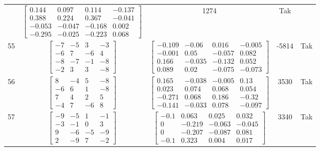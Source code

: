 \documentclass[a4paper,12pt]{article}
\begin{document}
\begin{tabular}{c c c c c}
&
$\begin{bmatrix} 0.144 & 0.097 & 0.114 & -0.137 \\ 0.388 & 0.224 & 0.367 & -0.041 \\ -0.053 & -0.047 & -0.168 & 0.002 \\ -0.295 & -0.025 & -0.223 & 0.068 \end{bmatrix}$
&
1274
&
Tak
\\
55
&
$\begin{bmatrix} -7 & -5 & 3 & -3 \\ -6 & 7 & -6 & 4 \\ -8 & -7 & -1 & -8 \\ -2 & 3 & 3 & -8 \end{bmatrix}$
&
$\begin{bmatrix} -0.109 & -0.06 & 0.016 & -0.005 \\ -0.001 & 0.05 & -0.057 & 0.082 \\ 0.166 & -0.035 & -0.132 & 0.052 \\ 0.089 & 0.02 & -0.075 & -0.073 \end{bmatrix}$
&
-5814
&
Tak
\\
56
&
$\begin{bmatrix} 8 & -4 & 5 & -8 \\ -6 & 6 & 1 & -8 \\ 7 & 4 & 2 & 5 \\ -4 & 7 & -6 & 8 \end{bmatrix}$
&
$\begin{bmatrix} 0.165 & -0.038 & -0.005 & 0.13 \\ 0.023 & 0.074 & 0.068 & 0.054 \\ -0.271 & 0.068 & 0.186 & -0.32 \\ -0.141 & -0.033 & 0.078 & -0.097 \end{bmatrix}$
&
3530
&
Tak
\\
57
&
$\begin{bmatrix} -9 & -5 & 1 & -1 \\ -3 & -1 & 0 & 3 \\ 9 & -6 & -5 & -9 \\ 2 & -9 & 7 & -2 \end{bmatrix}$
&
$\begin{bmatrix} -0.1 & 0.063 & 0.025 & 0.032 \\ 0 & -0.219 & -0.063 & -0.045 \\ 0 & -0.207 & -0.087 & 0.081 \\ -0.1 & 0.323 & 0.004 & 0.017 \end{bmatrix}$
&
3340
&
Tak
\\

\end{tabular}
\end{document}
